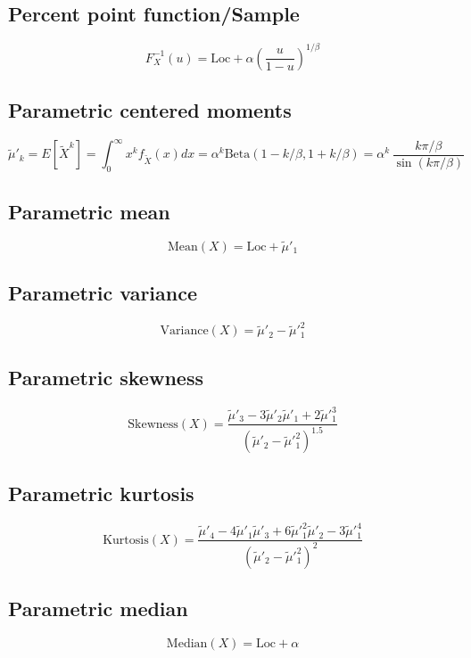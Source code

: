 \documentclass{article}
\begin{document}
\subsection{Percent point function/Sample}
\begin{equation*} F^{-1}_{X}\left(u\right)=\text{Loc}+\alpha\left(\frac{u}{1-u}\right)^{1/\beta} \end{equation*}
\subsection{Parametric centered moments}
\begin{equation*} \tilde{\mu}'_{k}=E[\tilde{X}^k]=\int_{0}^{\infty}x^{k}f_{\tilde{X}}\left(x\right)dx=\alpha^k \text{Beta}(1-k/\beta,1+k/\beta)=\alpha^k\,\frac{k\pi/\beta}{\sin(k\pi/\beta)} \end{equation*}
\subsection{Parametric mean}
\begin{equation*} \mathrm{Mean}(X)=\text{Loc}+\tilde{\mu}'_{1} \end{equation*}
\subsection{Parametric variance}
\begin{equation*} \mathrm{Variance}(X)=\tilde{\mu}'_{2}-\tilde{\mu}'^{2}_{1} \end{equation*}
\subsection{Parametric skewness}
\begin{equation*} \mathrm{Skewness}(X)=\frac{\tilde{\mu}'_{3}-3\tilde{\mu}'_{2}\tilde{\mu}'_{1}+2\tilde{\mu}'^{3}_{1}}{(\tilde{\mu}'_{2}-\tilde{\mu}'^{2}_{1})^{1.5}} \end{equation*}
\subsection{Parametric kurtosis}
\begin{equation*} \mathrm{Kurtosis}(X)=\frac{\tilde{\mu}'_{4}-4\tilde{\mu}'_{1}\tilde{\mu}'_{3}+6\tilde{\mu}'^{2}_{1}\tilde{\mu}'_{2}-3\tilde{\mu}'^{4}_{1}}{(\tilde{\mu}'_{2}-\tilde{\mu}'^{2}_{1})^{2}} \end{equation*}
\subsection{Parametric median}
\begin{equation*} \mathrm{Median}(X)=\text{Loc}+\alpha \end{equation*}
\end{document}

